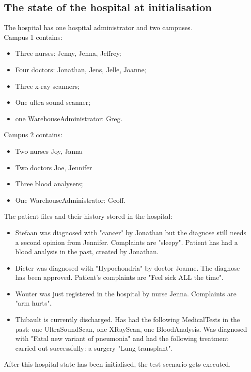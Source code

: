 \documentclass[12pt]{article}
\begin{document}
\subsection{The state of the hospital at initialisation}
The hospital has one hospital administrator and two campuses.\\
Campus 1 contains: 
\begin{itemize}
\item{Three nurses: Jenny, Jenna, Jeffrey;}
\item{Four doctors: Jonathan, Jens, Jelle, Joanne;}
\item{Three x-ray scanners;}
\item{One ultra sound scanner;}
\item{one WarehouseAdministrator: Greg.}
\end{itemize}
Campus 2 contains:
\begin{itemize}
\item{Two nurses Joy, Janna}
\item{Two doctors Joe, Jennifer}
\item{Three blood analysers;}
\item{One WarehouseAdministrator: Geoff.}
\end{itemize}
The patient files and their history stored in the hospital:
\begin{itemize}
\item{Stefaan was diagnosed with "cancer" by Jonathan but the diagnose still needs a second opinion from Jennifer. Complaints are "sleepy". Patient has had a blood analysis in the past, created by Jonathan.}
\item{Dieter was diagnosed with "Hypochondria" by doctor Joanne. The diagnose has been approved. Patient's complaints are "Feel sick ALL the time".}
\item{Wouter was just registered in the hospital by nurse Jenna. Complaints are "arm hurts".}
\item{Thibault is currently discharged. Has had the following MedicalTests in the past: one UltraSoundScan, one XRayScan, one BloodAnalysis. Was diagnosed with "Fatal new variant of pneumonia" and had the following treatment carried out successfully: a surgery "Lung transplant".}
\end{itemize}
After this hospital state has been initialised, the test scenario gets executed.
\end{document}
